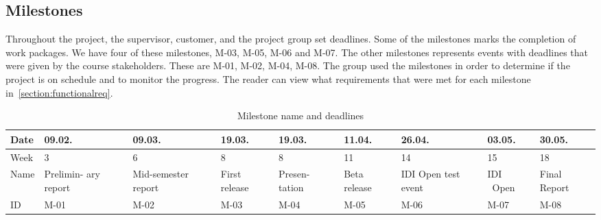 \pagebreak
\subsection{Milestones}
\label{sec:milestones}
Throughout the project, the supervisor, customer, and the project group set
deadlines. Some of the milestones marks the completion of work packages. We
have four of these milestones, M-03, M-05, M-06 and M-07. The other milestones
represents events with deadlines that were given by the course stakeholders.
These are M-01, M-02, M-04, M-08. The group used the milestones in order
to determine if the project is on schedule and to monitor the progress.
The reader can view what requirements that were met for each milestone
in~\ref{section:functionalreq}.

\begin{longtable}{|l|p{1.3cm}|p{1.3cm}|p{1.3cm}|p{1.3cm}|p{1.3cm}|p{1.3cm}|p{1.3cm}|p{1.3cm}|}
    \caption{Milestone name and deadlines} \label{table:milestone} \\
\hline

Date & 09.02. & 09.03. & 19.03. & 19.03. & 11.04. & 26.04. & 03.05. & 30.05.\\
\hline

Week & 3 & 6 & 8 & 8 & 11 & 14 & 15 & 18\\
\hline

Name & Prelimin- ary report & Mid-semester report & First release &
Presen- tation & Beta release & IDI Open test event & IDI \ Open & Final Report\\
\hline

ID & M-01 & M-02 & M-03 & M-04 & M-05 & M-06 & M-07 & M-08\\
\hline
\end{longtable}




